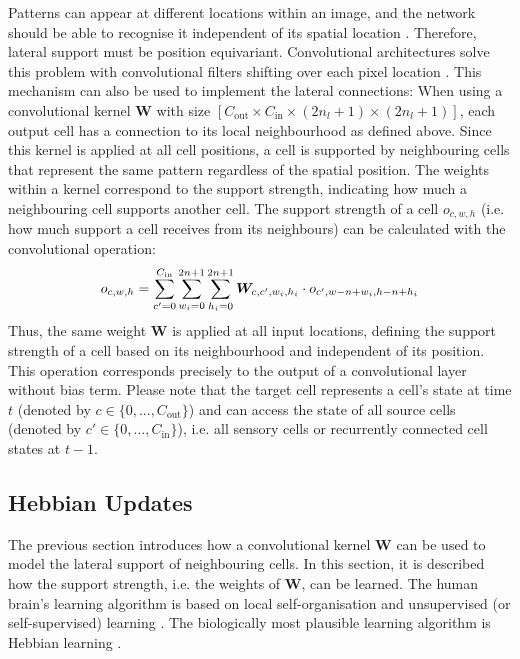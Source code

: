 Patterns can appear at different locations within an image, and the network should be able to recognise it independent of its spatial location . 
Therefore, lateral support must be position equivariant.
Convolutional architectures solve this problem with convolutional filters shifting over each pixel location . This mechanism can also be used to implement the lateral connections: When using a convolutional kernel $\boldsymbol{W}$ with size $\left[C_{\text{out}} \times C_{\text{in}} \times (2n_l+1) \times (2n_l+1) \right]$, each output cell has a connection to its local neighbourhood as defined above.
Since this kernel is applied at all cell positions, a cell is supported by neighbouring cells that represent the same pattern regardless of the spatial position.
The weights within a kernel correspond to the support strength, indicating how much a neighbouring cell supports another cell. The support strength of a cell $o_{c,w,h}$ (i.e. how much support a cell receives from its neighbours) can be calculated with the convolutional operation: 
%
\begin{align}\eqlbl{convlat_1}
	o_{c,w,h} = \sum_{c'=0}^{C_{\text{in}}} \sum_{w_i=0}^{2n+1} \sum_{h_i=0}^{2n+1} \boldsymbol{W}_{c, c',w_i,h_i} \cdot o_{c',w-n+w_i,h-n+h_i}
\end{align}
%
Thus, the same weight $\boldsymbol{W}$ is applied at all input locations, defining the support strength of a cell based on its neighbourhood and independent of its position.
This operation corresponds precisely to the output of a convolutional layer without bias term.
Please note that the target cell represents a cell's state at time $t$ (denoted by $c \in \{0, ..., C_{\text{out}}\}$) and can access the state of all source cells (denoted by $c' \in \{0, ..., C_{\text{in}}\}$), i.e. all sensory cells or recurrently connected cell states at $t-1$.

\subsection{Hebbian Updates}
The previous section introduces how a convolutional kernel $\boldsymbol{W}$ can be used to model the lateral support of neighbouring cells.
In this section, it is described how the support strength, i.e. the weights of $\boldsymbol{W}$, can be learned.
The human brain's learning algorithm is based on local self-organisation and unsupervised (or self-supervised) learning . The biologically most plausible learning algorithm is Hebbian learning .

